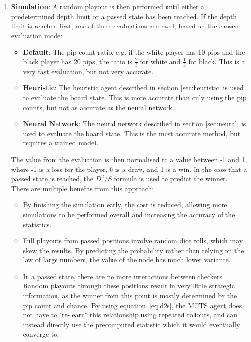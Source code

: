 \begin{enumerate}
    \item \textbf{Simulation}: A random playout is then performed until either a predetermined depth limit or a passed state has been reached. If the depth limit is reached first, one of three evaluations are used, based on the chosen evaluation mode:
    \begin{itemize}
        \item \textbf{Default}: The pip count ratio. e.g. if the white player has 10 pips and the black player has 20 pips, the ratio is $\frac{2}{3}$ for white and $\frac{1}{3}$ for black. This is a very fast evaluation, but not very accurate.
        \item \textbf{Heuristic}: The heuristic agent described in section \ref{sec:heuristic} is used to evaluate the board state. This is more accurate than only using the pip counts, but not as accurate as the neural network.
        \item \textbf{Neural Network}: The neural network described in section \ref{sec:neural} is used to evaluate the board state. This is the most accurate method, but requires a trained model.
    \end{itemize}
    The value from the evaluation is then normalised to a value between -1 and 1, where -1 is a loss for the player, 0 is a draw, and 1 is a win. 
    In the case that a passed state is reached, the $D^2/S$ formula is used to predict the winner. There are multiple benefits from this approach:
    \begin{itemize}
    \item By finishing the simulation early, the cost is reduced, allowing more simulations to be performed overall and increasing the accuracy of the statistics.
    \item Full playouts from passed positions involve random dice rolls, which may skew the results. By predicting the probability rather than relying on the law of large numbers, the value of the node has much lower variance.
    \item In a passed state, there are no more interactions between checkers. Random playouts through these positions result in very little strategic information, as the winner from this point is mostly determined by the pip count and chance. By using equation~\ref{eq:d2s}, the MCTS agent does not have to "re-learn" this relationship using repeated rollouts, and can instead directly use the precomputed statistic which it would eventually converge to.
    \end{itemize}


\end{enumerate}
